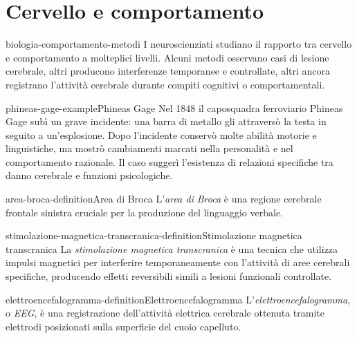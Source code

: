 \documentclass[preview]{standalone}
\begin{document}
\genpage

\section{Cervello e comportamento}

\begin{snippet}{biologia-comportamento-metodi}
    I neuroscienziati studiano il rapporto tra cervello e comportamento a
    molteplici livelli. Alcuni metodi osservano casi di lesione cerebrale,
    altri producono interferenze temporanee e controllate, altri ancora
    registrano l'attività cerebrale durante compiti cognitivi o comportamentali.
\end{snippet}

\begin{snippetexample}{phineas-gage-example}{Phineas Gage}
    Nel 1848 il caposquadra ferroviario Phineas Gage subì un grave incidente:
    una barra di metallo gli attraversò la testa in seguito a un'esplosione.
    Dopo l'incidente conservò molte abilità motorie e linguistiche, ma mostrò
    cambiamenti marcati nella personalità e nel comportamento razionale. Il
    caso suggerì l'esistenza di relazioni specifiche tra danno cerebrale e
    funzioni psicologiche.
\end{snippetexample}

\begin{snippetdefinition}{area-broca-definition}{Area di Broca}
    L'\emph{area di Broca} è una regione cerebrale frontale sinistra cruciale
    per la produzione del linguaggio verbale.
\end{snippetdefinition}

\begin{snippetdefinition}{stimolazione-magnetica-transcranica-definition}{Stimolazione magnetica transcranica}
    La \emph{stimolazione magnetica transcranica} è una tecnica che utilizza
    impulsi magnetici per interferire temporaneamente con l'attività di aree
    cerebrali specifiche, producendo effetti reversibili simili a lesioni
    funzionali controllate.
\end{snippetdefinition}

\begin{snippetdefinition}{elettroencefalogramma-definition}{Elettroencefalogramma}
    L'\emph{elettroencefalogramma}, o \emph{EEG}, è una registrazione
    dell'attività elettrica cerebrale ottenuta tramite elettrodi posizionati
    sulla superficie del cuoio capelluto.
\end{snippetdefinition}
\end{document}
